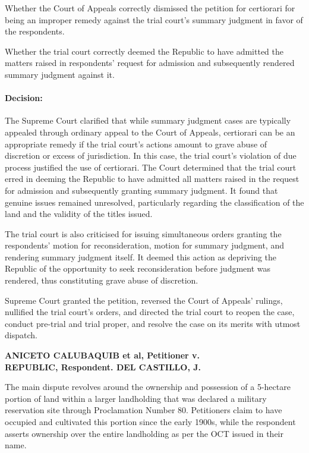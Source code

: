 \documentclass[
12pt,
oneside,
onehalfspacing,
headsepline
]{DigestCollection}
\begin{document}
Whether the Court of Appeals correctly dismissed the petition for certiorari for being an improper remedy against the trial court's summary judgment in favor of the respondents.

Whether the trial court correctly deemed the Republic to have admitted the matters raised in respondents' request for admission and subsequently rendered summary judgment against it.

\paragraph{Decision:}
\label{1b0b15e0-1236-11ef-aa24-9916ea601717}


The Supreme Court clarified that while summary judgment cases are typically appealed through ordinary appeal to the Court of Appeals, certiorari can be an appropriate remedy if the trial court's actions amount to grave abuse of discretion or excess of jurisdiction. In this case, the trial court's violation of due process justified the use of certiorari. The Court determined that the trial court erred in deeming the Republic to have admitted all matters raised in the request for admission and subsequently granting summary judgment. It found that genuine issues remained unresolved, particularly regarding the classification of the land and the validity of the titles issued.

The trial court is also criticised for issuing simultaneous orders granting the respondents' motion for reconsideration, motion for summary judgment, and rendering summary judgment itself. It deemed this action as depriving the Republic of the opportunity to seek reconsideration before judgment was rendered, thus constituting grave abuse of discretion.

Supreme Court granted the petition, reversed the Court of Appeals' rulings, nullified the trial court's orders, and directed the trial court to reopen the case, conduct pre-trial and trial proper, and resolve the case on its merits with utmost dispatch.

\label{fce61a10-0a29-11ef-a1a5-03b0bde1fccf}


\noindent\textbf{ANICETO CALUBAQUIB et al, Petitioner v. \\REPUBLIC, Respondent. DEL CASTILLO, J.}\vspace{0.4cm}

The main dispute revolves around the ownership and possession of a 5-hectare portion of land within a larger landholding that was declared a military reservation site through Proclamation Number 80. Petitioners claim to have occupied and cultivated this portion since the early 1900s, while the respondent asserts ownership over the entire landholding as per the OCT issued in their name. 
\end{document}
